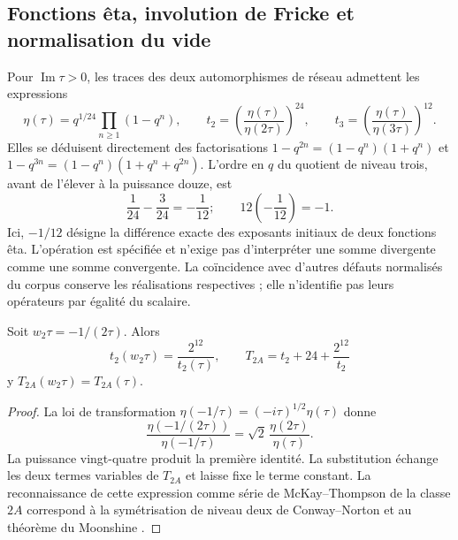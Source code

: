 \subsection{Fonctions êta, involution de Fricke et normalisation du vide}
\label{x_reciprocidad:km:fricke}

Pour \(\operatorname{Im}\tau>0\), les traces des deux automorphismes de réseau admettent les expressions
\begin{equation}
 \eta(\tau)=q^{1/24}\prod_{n\ge1}(1-q^n),\qquad
 t_2=\left(\frac{\eta(\tau)}{\eta(2\tau)}\right)^{24},\qquad
 t_3=\left(\frac{\eta(\tau)}{\eta(3\tau)}\right)^{12}.
 \label{x_reciprocidad:km:eta-trazas}
\end{equation}
Elles se déduisent directement des factorisations
\(1-q^{2n}=(1-q^n)(1+q^n)\) et
\(1-q^{3n}=(1-q^n)(1+q^n+q^{2n})\). L'ordre en \(q\) du
quotient de niveau trois, avant de l'élever à la puissance douze, est
\[
 \frac1{24}-\frac3{24}=-\frac1{12};
 \qquad 12\left(-\frac1{12}\right)=-1.
\]
Ici, \(-1/12\) désigne la différence exacte des exposants initiaux de deux fonctions êta. L'opération est spécifiée et n'exige pas d'interpréter une somme divergente comme une somme convergente. La coïncidence avec d'autres défauts normalisés du corpus conserve les réalisations respectives ; elle n'identifie pas leurs opérateurs par égalité du scalaire.

\begin{proposition}
\label{x_reciprocidad:km:fricke-prop}
Soit \(w_2\tau=-1/(2\tau)\). Alors
\begin{equation}
 t_2(w_2\tau)=\frac{2^{12}}{t_2(\tau)},\qquad
 T_{2A}=t_2+24+\frac{2^{12}}{t_2}
 \label{x_reciprocidad:km:fricke-t2}
\end{equation}
y \(T_{2A}(w_2\tau)=T_{2A}(\tau)\).
\end{proposition}
\begin{proof}
La loi de transformation
\(\eta(-1/\tau)=(-i\tau)^{1/2}\eta(\tau)\) donne
\[
 \frac{\eta(-1/(2\tau))}{\eta(-1/\tau)}
 =\sqrt2\,\frac{\eta(2\tau)}{\eta(\tau)}.
\]
La puissance vingt-quatre produit la première identité. La substitution
échange les deux termes variables de \(T_{2A}\) et laisse fixe
le terme constant. La reconnaissance de cette expression comme série
de McKay--Thompson de la classe \(2A\) correspond à la
symétrisation de niveau deux de Conway--Norton
\cite[\S\S4 y 6, tabla~3]{x_reciprocidad:kmconwaynorton1979} et au théorème
du Moonshine \cite{x_reciprocidad:borcherds}.
\end{proof}

